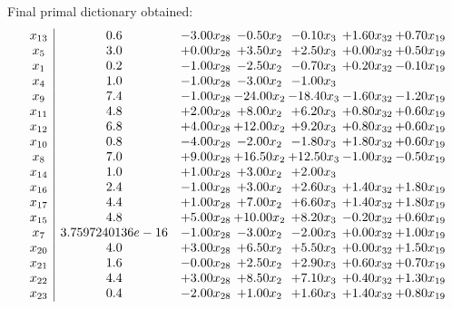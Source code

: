 \documentclass[8pt]{article}
\begin{document}
 Final primal dictionary obtained: 
\[\begin{array}{c| c c@{\hskip 2pt} c@{\hskip 2pt} c@{\hskip 2pt} c@{\hskip 2pt} c@{\hskip 2pt} }
 x_{13}   &  0.6 & -3.00 x_{28} & -0.50 x_{2} & -0.10 x_{3} & +  1.60 x_{32} & +  0.70 x_{19}\\
 x_{5}   &  3.0 & +  0.00 x_{28} & +  3.50 x_{2} & +  2.50 x_{3} & +  0.00 x_{32} & +  0.50 x_{19}\\
 x_{1}   &  0.2 & -1.00 x_{28} & -2.50 x_{2} & -0.70 x_{3} & +  0.20 x_{32} & -0.10 x_{19}\\
 x_{4}   &  1.0 & -1.00 x_{28} & -3.00 x_{2} & -1.00 x_{3} &    &   \\
 x_{9}   &  7.4 & -1.00 x_{28} & -24.00 x_{2} & -18.40 x_{3} & -1.60 x_{32} & -1.20 x_{19}\\
 x_{11}   &  4.8 & +  2.00 x_{28} & +  8.00 x_{2} & +  6.20 x_{3} & +  0.80 x_{32} & +  0.60 x_{19}\\
 x_{12}   &  6.8 & +  4.00 x_{28} & + 12.00 x_{2} & +  9.20 x_{3} & +  0.80 x_{32} & +  0.60 x_{19}\\
 x_{10}   &  0.8 & -4.00 x_{28} & -2.00 x_{2} & -1.80 x_{3} & +  1.80 x_{32} & +  0.60 x_{19}\\
 x_{8}   &  7.0 & +  9.00 x_{28} & + 16.50 x_{2} & + 12.50 x_{3} & -1.00 x_{32} & -0.50 x_{19}\\
 x_{14}   &  1.0 & +  1.00 x_{28} & +  3.00 x_{2} & +  2.00 x_{3} &    &   \\
 x_{16}   &  2.4 & -1.00 x_{28} & +  3.00 x_{2} & +  2.60 x_{3} & +  1.40 x_{32} & +  1.80 x_{19}\\
 x_{17}   &  4.4 & +  1.00 x_{28} & +  7.00 x_{2} & +  6.60 x_{3} & +  1.40 x_{32} & +  1.80 x_{19}\\
 x_{15}   &  4.8 & +  5.00 x_{28} & + 10.00 x_{2} & +  8.20 x_{3} & -0.20 x_{32} & +  0.60 x_{19}\\
 x_{7}   &  3.7597240136e-16 & -1.00 x_{28} & -3.00 x_{2} & -2.00 x_{3} & +  0.00 x_{32} & +  1.00 x_{19}\\
 x_{20}   &  4.0 & +  3.00 x_{28} & +  6.50 x_{2} & +  5.50 x_{3} & +  0.00 x_{32} & +  1.50 x_{19}\\
 x_{21}   &  1.6 & -0.00 x_{28} & +  2.50 x_{2} & +  2.90 x_{3} & +  0.60 x_{32} & +  0.70 x_{19}\\
 x_{22}   &  4.4 & +  3.00 x_{28} & +  8.50 x_{2} & +  7.10 x_{3} & +  0.40 x_{32} & +  1.30 x_{19}\\
 x_{23}   &  0.4 & -2.00 x_{28} & +  1.00 x_{2} & +  1.60 x_{3} & +  1.40 x_{32} & +  0.80 x_{19}\\

\end{array}\]
\end{document}
